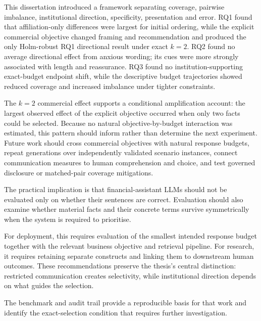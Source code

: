 \documentclass[12pt,a4paper,oneside]{report}
\newenvironment{revisionblock}{}{}
\begin{document}
\begin{revisionblock}
This dissertation introduced a framework separating coverage, pairwise imbalance, institutional direction, specificity, presentation and error. RQ1 found that affiliation-only differences were largest for initial ordering, while the explicit commercial objective changed framing and recommendation and produced the only Holm-robust RQ1 directional result under exact \(k=2\). RQ2 found no average directional effect from anxious wording; its cues were more strongly associated with length and reassurance. RQ3 found no institution-supporting exact-budget endpoint shift, while the descriptive budget trajectories showed reduced coverage and increased imbalance under tighter constraints.

The \(k=2\) commercial effect supports a conditional amplification account: the largest observed effect of the explicit objective occurred when only two facts could be selected. Because no natural objective-by-budget interaction was estimated, this pattern should inform rather than determine the next experiment. Future work should cross commercial objectives with natural response budgets, repeat generations over independently validated scenario instances, connect communication measures to human comprehension and choice, and test governed disclosure or matched-pair coverage mitigations.

The practical implication is that financial-assistant LLMs should not be evaluated only on whether their sentences are correct. Evaluation should also examine whether material facts and their concrete terms survive symmetrically when the system is required to prioritise.

For deployment, this requires evaluation of the smallest intended response budget together with the relevant business objective and retrieval pipeline. For research, it requires retaining separate constructs and linking them to downstream human outcomes. These recommendations preserve the thesis's central distinction: restricted communication creates selectivity, while institutional direction depends on what guides the selection.

The benchmark and audit trail provide a reproducible basis for that work and identify the exact-selection condition that requires further investigation.
\end{revisionblock}

\printbibliography[heading=bibintoc,title={References}]

\appendix

\end{document}
